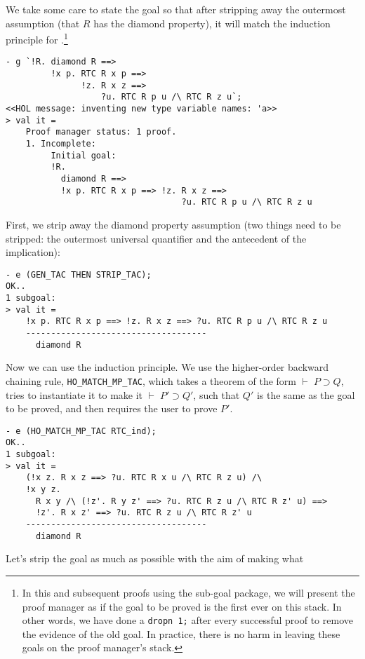 \documentclass[12pt]{article}
\begin{document}
We take some care to state the goal so that after stripping away the
outermost assumption (that $R$ has the diamond property), it will match the
induction principle for .\footnote{In this and subsequent
  proofs using the sub-goal package, we will present the proof manager
  as if the goal to be proved is the first ever on this stack.  In
  other words, we have done a \texttt{dropn 1;} after every successful
  proof to remove the evidence of the old goal.  In practice, there is
  no harm in leaving these goals on the proof manager's stack.}
\begin{session}\begin{verbatim}
- g `!R. diamond R ==>
         !x p. RTC R x p ==>
               !z. R x z ==>
                   ?u. RTC R p u /\ RTC R z u`;
<<HOL message: inventing new type variable names: 'a>>
> val it =
    Proof manager status: 1 proof.
    1. Incomplete:
         Initial goal:
         !R.
           diamond R ==>
           !x p. RTC R x p ==> !z. R x z ==>
                                   ?u. RTC R p u /\ RTC R z u
\end{verbatim}\end{session}
First, we strip away the diamond property assumption (two things need to
be stripped: the outermost universal quantifier and the antecedent of
the implication):
\begin{session}\begin{verbatim}
- e (GEN_TAC THEN STRIP_TAC);
OK..
1 subgoal:
> val it =
    !x p. RTC R x p ==> !z. R x z ==> ?u. RTC R p u /\ RTC R z u
    ------------------------------------
      diamond R
\end{verbatim}\end{session}
Now we can use the induction principle.  We use the higher-order
backward chaining rule, \texttt{HO\_MATCH\_MP\_TAC}, which takes a
theorem of the form $\vdash\;P\supset Q$, tries to instantiate it to
make it $\vdash\;P'\supset Q'$, such that $Q'$ is the same as the goal
to be proved, and then requires the user to prove $P'$.
\begin{session}\begin{verbatim}
- e (HO_MATCH_MP_TAC RTC_ind);
OK..
1 subgoal:
> val it =
    (!x z. R x z ==> ?u. RTC R x u /\ RTC R z u) /\
    !x y z.
      R x y /\ (!z'. R y z' ==> ?u. RTC R z u /\ RTC R z' u) ==>
      !z'. R x z' ==> ?u. RTC R z u /\ RTC R z' u
    ------------------------------------
      diamond R
\end{verbatim}\end{session}
Let's strip the goal as much as possible with the aim of making what
\end{document}
